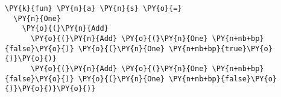 {\small
\begin{Verbatim}[commandchars=\\\{\}]
\PY{k}{fun} \PY{n}{a} \PY{n}{s} \PY{o}{=}
  \PY{n}{One}
    \PY{o}{(}\PY{n}{Add}
      \PY{o}{(}\PY{n}{Add} \PY{o}{(}\PY{n}{One} \PY{n+nb+bp}{false}\PY{o}{)} \PY{o}{(}\PY{n}{One} \PY{n+nb+bp}{true}\PY{o}{)}\PY{o}{)}
      \PY{o}{(}\PY{n}{Add} \PY{o}{(}\PY{n}{One} \PY{n+nb+bp}{false}\PY{o}{)} \PY{o}{(}\PY{n}{One} \PY{n+nb+bp}{false}\PY{o}{)}\PY{o}{)}\PY{o}{)}
\end{Verbatim}
}